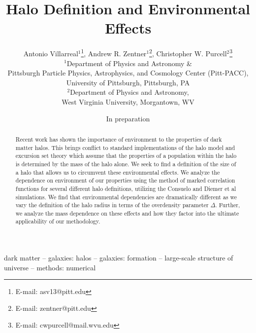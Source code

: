 \documentclass[usenatbib,usegraphicx,letterpaper]{mn2e}
\begin{document}
\title[Halo Environmental Effects as a Function of Halo Definition]{Halo Definition and Environmental Effects}
\author[Antonio Villarreal, Andrew R. Zentner, Christopher W. Purcell]
{Antonio Villarreal$^1$\thanks{E-mail: asv13@pitt.edu},
 Andrew R. Zentner$^1$\thanks{E-mail: zentner@pitt.edu}, 
 Christopher W. Purcell$^2$\thanks{E-mail: cwpurcell@mail.wvu.edu}\\
$^{1}$Department of Physics and Astronomy \& \\
Pittsburgh Particle Physics, Astrophysics, and Cosmology Center (Pitt-PACC),\\ 
University of Pittsburgh, Pittsburgh, PA\\
$^{2}$Department of Physics and Astronomy, \\
West Virginia University, Morgantown, WV}

\date{In preparation}



\maketitle

\begin{abstract}
Recent work has shown the importance of environment to the properties of dark matter halos. This brings conflict to standard implementations of the halo model and excursion set theory which assume that the properties of a population within the halo is determined by the mass of the halo alone. We seek to find a definition of the size of a halo that allows us to circumvent these environmental effects. We analyze the dependence on environment of our properties using the method of marked correlation functions for several different halo definitions, utilizing the Consuelo and Diemer et al simulations. We find that environmental dependencies are dramatically different as we vary the definition of the halo radius in terms of the overdensity parameter $\Delta$.  Further, we analyze the mass dependence on these effects and how they factor into the ultimate applicability of our methodology.
\end{abstract}

\begin{keywords}
dark matter -- galaxies: halos -- galaxies: formation -- large-scale structure of universe -- methods: numerical
\end{keywords}
\end{document}
